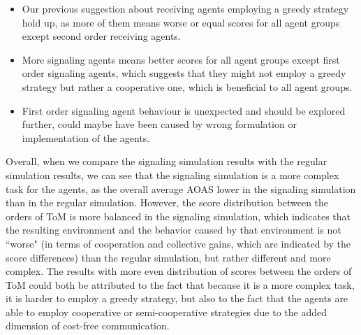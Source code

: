 \begin{itemize}
    \item Our previous suggestion about receiving agents employing a greedy strategy hold up, as more of them means worse or equal scores for all agent groups except second order receiving agents.
    \item More signaling agents means better scores for all agent groups except first order signaling agents, which suggests that they might not employ a greedy strategy but rather a cooperative one, which is beneficial to all agent groups.
    \item First order signaling agent behaviour is unexpected and should be explored further, could maybe have been caused by wrong formulation or implementation of the agents.
\end{itemize}

Overall, when we compare the signaling simulation results with the regular simulation results, we can see that the signaling simulation is a more complex task for the agents, as the overall average AOAS lower in the signaling simulation than in the regular simulation. However, the score distribution between the orders of ToM is more balanced in the signaling simulation, which indicates that the resulting environment and the behavior caused by that environment is not ``worse" (in terms of cooperation and collective gains, which are indicated by the score differences) than the regular simulation, but rather different and more complex. The results with more even distribution of scores between the orders of ToM could both be attributed to the fact that because it is a more complex task, it is harder to employ a greedy strategy, but also to the fact that the agents are able to employ cooperative or semi-cooperative strategies due to the added dimension of cost-free communication. 